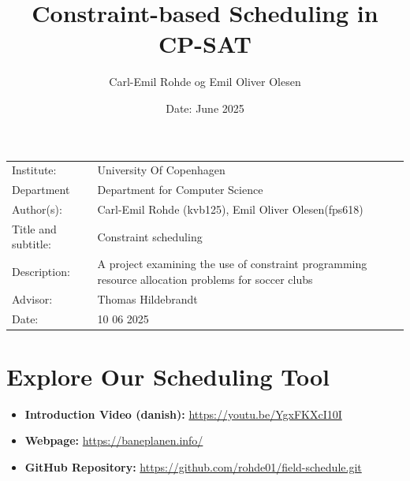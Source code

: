 \documentclass[12pt]{article}
\author{Carl-Emil Rohde og Emil Oliver Olesen}
\title{Constraint-based Scheduling in CP-SAT}
\date{Date: {June 2025}}
\begin{document}
\maketitle




\onehalfspacing


\begin{table}[h]
\def\arraystretch{1.5}
\begin{tabularx}{\textwidth}{l X}
Institute: & {University Of Copenhagen}  \\
Department & {Department for Computer Science} \\
Author(s): & {Carl-Emil Rohde (kvb125), Emil Oliver Olesen(fps618)} \\
Title and subtitle: & {Constraint scheduling} \\
Description: & A project examining the use of constraint programming resource allocation problems for soccer clubs \\
Advisor: & {Thomas Hildebrandt} \\
Date: & 10 06 2025
\end{tabularx}
\end{table}


\section*{Explore Our Scheduling Tool}


\begin{itemize}
    \item \textbf{Introduction Video (danish):} \url{https://youtu.be/YgxFKXcI10I}
    \item \textbf{Webpage:} \url{https://baneplanen.info/}
    \item \textbf{GitHub Repository:} \url{https://github.com/rohde01/field-schedule.git}
\end{itemize}




\newpage
\end{document}
